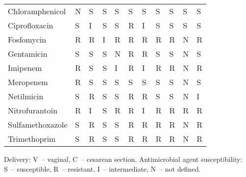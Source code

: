 \begin{table}
\begin{threeparttable}
\begin{tabular}{lllllllllll}
             Chloramphenicol &       N &      S &      S &      S &      S &      S &      S &      S &      S &      S \\
               Ciprofloxacin &       S &      I &      S &      S &      R &      I &      S &      S &      S &      S \\
                  Fosfomycin &       R &      R &      I &      R &      R &      R &      R &      R &      N &      R \\
                  Gentamicin &       S &      S &      S &      N &      R &      R &      S &      S &      N &      S \\
                    Imipenem &       R &      S &      S &      I &      R &      I &      R &      R &      N &      R \\
                   Meropenem &       R &      S &      S &      S &      S &      S &      S &      S &      N &      S \\
                  Netilmicin &       S &      R &      S &      S &      R &      R &      S &      S &      N &      I \\
              Nitrofurantoin &       R &      I &      S &      R &      R &      I &      R &      R &      R &      R \\
            Sulfamethoxazole &       S &      R &      S &      S &      R &      R &      R &      R &      N &      R \\
                Trimethoprim &       S &      R &      S &      S &      R &      R &      R &      R &      N &      R \\
\bottomrule
\end{tabular}

\begin{tablenotes}
\item
Delivery: V~-- vaginal, C~-- cesarean section.
Antimicrobial agent susceptibility: S~-- susceptible, R~-- resistant, I~-- intermediate, N~-- not defined.
\end{tablenotes}
\end{threeparttable}
\end{table}
